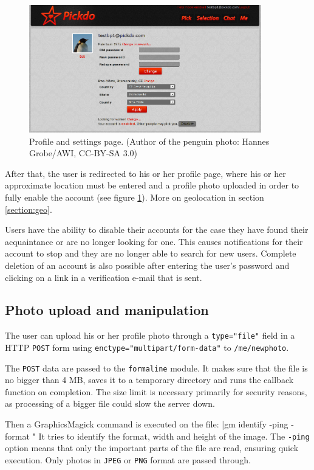 \documentclass[12pt,oneside]{fithesis}
\begin{document}
		\begin{figure}[h]
	  \centering
	    \includegraphics[width=0.9\textwidth]{screen-profile.png}
		  \caption{Profile and settings page. (Author of the penguin photo: Hannes Grobe/AWI, CC-BY-SA 3.0)}
		  \label{fig:screen-profile}
	  \end{figure}	  
	  
	  After that, the user is redirected to his or her profile page, where his or her approximate location must be entered and a profile photo uploaded in order to fully enable the account (see figure \ref{fig:screen-profile}). More on geolocation in section \ref{section:geo}.
	  
	  Users have the ability to disable their accounts for the case they have found their acquaintance or are no longer looking for one. This causes notifications for their account to stop and they are no longer able to search for new users. Complete deletion of an account is also possible after entering the user's password and clicking on a link in a verification e-mail that is sent.
	\subsection{Photo upload and manipulation}
		The user can upload his or her profile photo through a \texttt{type="file"} field in a HTTP \texttt{POST} form using \texttt{enctype="multipart/form-data"} to \texttt{/me/newphoto}.
		
		The \texttt{POST} data are passed to the \texttt{formaline} module. It makes sure that the file is no bigger than 4 MB, saves it to a temporary directory and runs the callback function on completion. The size limit is necessary primarily for security reasons, as processing of a bigger file could slow the server down.
		
		Then a GraphicsMagick command is executed on the file:
		|gm identify -ping -format "%
		It tries to identify the format, width and height of the image. The \texttt{-ping} option means that only the important parts of the file are read, ensuring quick execution. Only photos in \texttt{JPEG} or \texttt{PNG} format are passed through.
		
\end{document}
